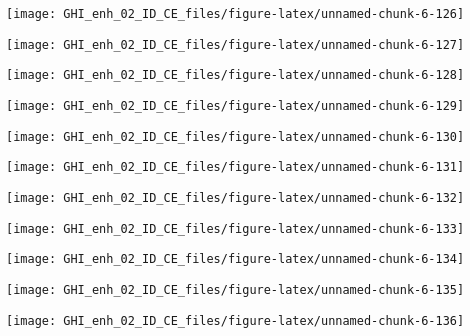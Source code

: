 \documentclass[
  10pt,
  a4paper,oneside]{article}
\begin{document}
\begin{center}\texttt{[image: GHI\_enh\_02\_ID\_CE\_files/figure-latex/unnamed-chunk-6-126]} \end{center}

\begin{center}\texttt{[image: GHI\_enh\_02\_ID\_CE\_files/figure-latex/unnamed-chunk-6-127]} \end{center}

\begin{center}\texttt{[image: GHI\_enh\_02\_ID\_CE\_files/figure-latex/unnamed-chunk-6-128]} \end{center}

\begin{center}\texttt{[image: GHI\_enh\_02\_ID\_CE\_files/figure-latex/unnamed-chunk-6-129]} \end{center}

\begin{center}\texttt{[image: GHI\_enh\_02\_ID\_CE\_files/figure-latex/unnamed-chunk-6-130]} \end{center}

\begin{center}\texttt{[image: GHI\_enh\_02\_ID\_CE\_files/figure-latex/unnamed-chunk-6-131]} \end{center}

\begin{center}\texttt{[image: GHI\_enh\_02\_ID\_CE\_files/figure-latex/unnamed-chunk-6-132]} \end{center}

\begin{center}\texttt{[image: GHI\_enh\_02\_ID\_CE\_files/figure-latex/unnamed-chunk-6-133]} \end{center}

\begin{center}\texttt{[image: GHI\_enh\_02\_ID\_CE\_files/figure-latex/unnamed-chunk-6-134]} \end{center}

\begin{center}\texttt{[image: GHI\_enh\_02\_ID\_CE\_files/figure-latex/unnamed-chunk-6-135]} \end{center}

\begin{center}\texttt{[image: GHI\_enh\_02\_ID\_CE\_files/figure-latex/unnamed-chunk-6-136]} \end{center}
\end{document}
